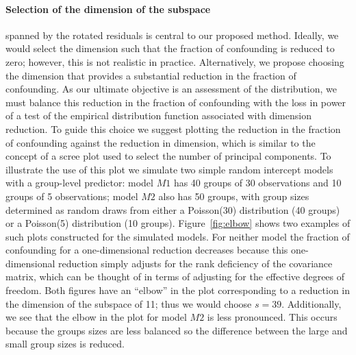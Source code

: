 \documentclass[12pt]{article} %
\newcommand{\hh}[1]{{\color{orange} #1}}
\begin{document}
\paragraph{Selection of the dimension of the subspace}
 spanned by the rotated residuals is central to our proposed method. Ideally, we would select the dimension such that the fraction of confounding is reduced to zero; however, this is not realistic in practice. Alternatively, we propose choosing the dimension that provides a substantial reduction in the fraction of confounding. As our ultimate objective is an assessment of the distribution, we must balance this reduction in the fraction of confounding with the loss in power of a test of the empirical distribution function %
 associated with dimension reduction. To guide this choice we suggest plotting the reduction in the fraction of confounding against the reduction in dimension, which is similar to the concept of a scree plot used to select the number of principal components. %
 To illustrate the use of this plot we simulate two simple random intercept models with a group-level predictor:   model $M1$ has 40 groups of 30 observations and 10 groups of 5 observations;   model $M2$ also has 50 groups, with group sizes determined as random draws from either a Poisson(30) distribution (40 groups) or a Poisson(5) distribution (10 groups). %
 Figure~\ref{fig:elbow} shows two examples of such plots constructed for the simulated models. For neither model the fraction of confounding for a one-dimensional reduction decreases because this {one-dimensional reduction} simply adjusts for the rank deficiency of the covariance matrix, which can be thought of in terms of adjusting for the effective degrees of freedom. Both figures have an ``elbow'' in the plot corresponding to a reduction in the dimension of the subspace of 11; thus we would choose $s = 39$. { Additionally, we see that the elbow in the plot for model $M2$ is less pronounced. This occurs because the groups sizes are less balanced so the difference between the large and small group sizes is reduced.}
 
\end{document}
